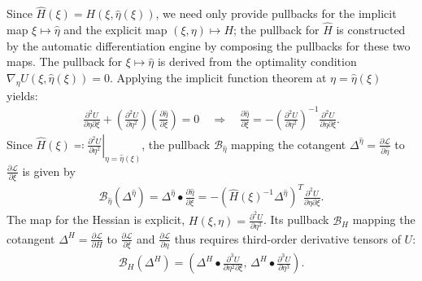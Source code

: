 \documentclass{article}
\begin{document}
Since $\hat{H}(\xi) = H(\xi, \hat{\eta}(\xi))$, we need only provide pullbacks for the implicit map $\xi \mapsto \hat{\eta}$ and the explicit map $(\xi, \eta) \mapsto H$;
the pullback for $\hat{H}$ is constructed by the automatic differentiation engine by composing the pullbacks for these two maps.
The pullback for $\xi \mapsto \hat{\eta}$ is derived from the optimality condition $\nabla_\eta U(\xi, \hat{\eta}(\xi)) = 0$.
Applying the implicit function theorem at $\eta = \hat{\eta}(\xi)$ yields:
%
\begin{align}
  \frac{\partial^2 U}{\partial \eta \partial \xi} + \left(\frac{\partial^2 U}{\partial \eta^2}\right) \left(\frac{\partial \hat{\eta}}{\partial \xi}\right) = 0
  \quad \Rightarrow \quad
  \frac{\partial \hat{\eta}}{\partial \xi} = -\left(\frac{\partial^2 U}{\partial \eta^2}\right)^{-1} \frac{\partial^2 U}{\partial \eta \partial \xi}.
\end{align}
%
Since $\hat{H}(\xi) \eqqcolon \left. \frac{\partial^2 U}{\partial \eta^2} \right|_{\eta=\hat{\eta}(\xi)}$, the pullback $\mathcal{B}_{\hat{\eta}}$ mapping the cotangent $\Delta^{\hat{\eta}} = \frac{\partial \mathcal{L}}{\partial \hat{\eta}}$ to $\frac{\partial \mathcal{L}}{\partial \xi}$ is given by
%
\begin{align}\label{eq:pullback-eta-hat}
  \mathcal{B}_{\hat{\eta}}(\Delta^{\hat{\eta}})
  = \Delta^{\hat{\eta}} \bullet \frac{\partial \hat{\eta}}{\partial \xi}
  = -\left( \hat{H}(\xi)^{-1} \Delta^{\hat{\eta}} \right)^{T} \frac{\partial^2 U}{\partial \eta \partial \xi}.
\end{align}
%
The map for the Hessian is explicit, $H(\xi, \eta) = \frac{\partial^2 U}{\partial \eta^2}$.
Its pullback $\mathcal{B}_H$ mapping the cotangent $\Delta^H = \frac{\partial \mathcal{L}}{\partial H}$ to $\frac{\partial \mathcal{L}}{\partial \xi}$ and $\frac{\partial \mathcal{L}}{\partial \eta}$ thus requires third-order derivative tensors of $U$:
%
\begin{align}\label{eq:pullback-H}
  \mathcal{B}_H(\Delta^H) = \left( \Delta^H \bullet \frac{\partial^3 U}{\partial \eta^2 \partial \xi}, \, \Delta^H \bullet \frac{\partial^3 U}{\partial \eta^3} \right).
\end{align}
\end{document}
